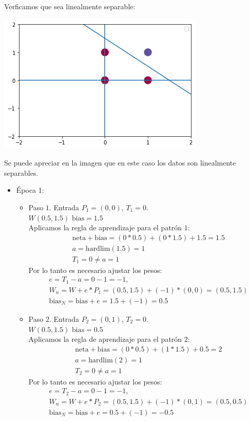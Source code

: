 \documentclass{article}
\begin{document}
{{Verficamos que sea linealmente separable:





\includegraphics[scale=0.5]{descarga.png}

Se puede apreciar en la imagen que en este caso los datos son linealmente separables.
\\
\begin{itemize}
\item Época 1:
\begin{itemize}
\item Paso $1$. Entrada $P_1 = (0, 0)$, $T_1 = 0$. \\
$W(0.5, 1.5)$  $\text{bias} = 1.5$ \\

Aplicamos la regla de aprendizaje para el patrón $1$:
\begin{align*}
&\text{neta} + \text{bias}= (0 * 0.5) + (0 * 1.5) + 1.5 = 1.5\\
&a = \text{hardlim}(1.5) = 1 \\
&T_1 = 0 \neq a = 1
\end{align*}
Por lo tanto es necesario ajustar los pesos:
\begin{align*}
&e = T_1- a = 0- 1=-1, \\
&W_n = W + e* P_1 = (0.5, 1.5) + (-1) * (0,0) = (0.5, 1.5) \\
&\text{bias}_N = \text{bias} + e = 1.5 + (-1) = 0.5
\end{align*}

\item Paso $2$. Entrada $P_2 = (0, 1)$, $T_2 = 0$. \\
$W(0.5, 1.5)$  $\text{bias} = 0.5$ \\

Aplicamos la regla de aprendizaje para el patrón $2$:
\begin{align*}
&\text{neta} + \text{bias}= (0 * 0.5) + (1 * 1.5) + 0.5 = 2\\
&a = \text{hardlim}(2) = 1 \\
&T_2 = 0 \neq a = 1
\end{align*}
Por lo tanto es necesario ajustar los pesos:
\begin{align*}
&e = T_2- a = 0- 1=-1, \\
&W_n = W + e* P_2 = (0.5, 1.5) + (-1) * (0,1) = (0.5, 0.5) \\
&\text{bias}_N = \text{bias} + e = 0.5 + (-1) = -0.5
\end{align*}


\end{itemize}
\end{itemize}}}
\end{document}
